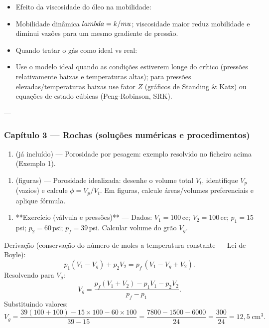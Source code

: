 \documentclass[11pt,a4paper]{article}
\begin{document}
\begin{itemize}
\item Efeito da viscosidade do óleo na mobilidade:
\item Mobilidade dinâmica $\\lambda = k/\\mu$; viscosidade maior reduz mobilidade e diminui vazões para um mesmo gradiente de pressão.
\end{itemize}

\begin{itemize}
\item Quando tratar o gás como ideal vs real:
\item Use o modelo ideal quando as condições estiverem longe do crítico (pressões relativamente baixas e temperaturas altas); para pressões elevadas/temperaturas baixas use fator $Z$ (gráficos de Standing & Katz) ou equações de estado cúbicas (Peng‑Robinson, SRK).
\end{itemize}

---

\subsubsection{Capítulo 3 — Rochas (soluções numéricas e procedimentos)}

\begin{enumerate}
\item (já incluído) — Porosidade por pesagem: exemplo resolvido no ficheiro acima (Exemplo 1).
\end{enumerate}

\begin{enumerate}
\item (figuras) — Porosidade idealizada: desenhe o volume total $V_t$, identifique $V_p$ (vazios) e calcule $\phi=V_p/V_t$. Em figuras, calcule áreas/volumes preferenciais e aplique fórmula.
\end{enumerate}

\begin{enumerate}
\item **Exercício (válvula e pressões)** — Dados: $V_1=100\,$cc; $V_2=100\,$cc; $p_1=15\,$psi; $p_2=60\,$psi; $p_f=39\,$psi. Calcular volume do grão $V_g$.
\end{enumerate}

Derivação (conservação do número de moles a temperatura constante — Lei de Boyle):
$$p_1(V_1-V_g)+p_2V_2=p_f\,(V_1-V_g+V_2).$$
Resolvendo para $V_g$:
$$V_g=\dfrac{p_f(V_1+V_2)-p_1V_1-p_2V_2}{p_f-p_1}.$$ 
Substituindo valores:
$$V_g=\dfrac{39(100+100)-15\times100-60\times100}{39-15}=\dfrac{7800-1500-6000}{24}=\dfrac{300}{24}=12{,}5\;\text{cm}^3.$$
\end{document}

